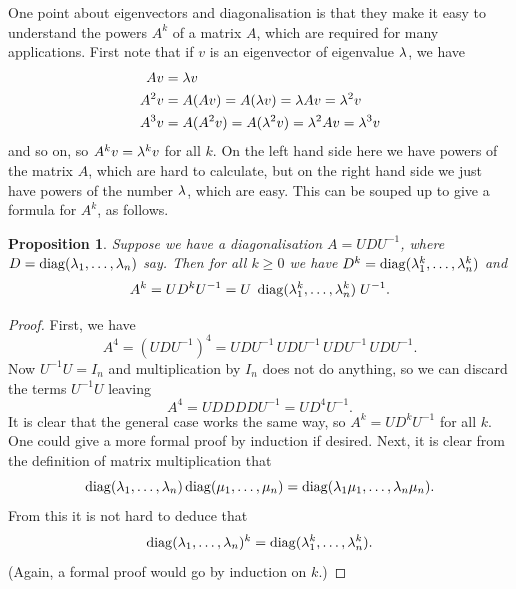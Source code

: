 \documentclass[reqno]{amsart}
\newtheorem{proposition}[theorem]{Proposition}
\theoremstyle{definition}
\begin{document}
One point about eigenvectors and diagonalisation is that they make it
easy to understand the powers $A^k$ of a matrix $A$, which are
required for many applications.  First note that if $v$ is an
eigenvector of eigenvalue $\lambda$, we have
\begin{align*}
 Av &= \lambda v \\
 A^2v &= A(Av)= A(\lambda v) = \lambda Av = \lambda^2v \\
 A^3v &= A(A^2v) = A(\lambda^2 v) = \lambda^2Av = \lambda^3 v 
\end{align*}
and so on, so $A^kv=\lambda^kv$ for all $k$.  On the left hand side here
we have powers of the matrix $A$, which are hard to calculate, but on
the right hand side we just have powers of the number $\lambda$, which are
easy.  This can be souped up to give a formula for $A^k$, as follows.

\begin{proposition}\label{prop-diag-powers}
 Suppose we have a diagonalisation $A=UDU^{-1}$, where
 $D=\operatorname{diag}(\lambda_1,\dotsc,\lambda_n)$ say.  Then for all $k\geq 0$ we have 
 $D^k=\operatorname{diag}(\lambda_1^k,\dotsc,\lambda_n^k)$ and 
 \[ A^k = UD^kU^{-1} = U\;\operatorname{diag}(\lambda_1^k,\dotsc,\lambda_n^k)\;U^{-1}. \]
\end{proposition}
\begin{proof}
 First, we have 
 \[ A^4 = (UDU^{-1})^4 = 
    UDU^{-1}\,UDU^{-1}\,UDU^{-1}\,UDU^{-1}.
 \]
 Now $U^{-1}U=I_n$ and multiplication by $I_n$ does not do anything,
 so we can discard the terms $U^{-1}U$ leaving
 \[ A^4 = UDDDDU^{-1} = UD^4 U^{-1}. \]
 It is clear that the general case works the same way, so
 $A^k=UD^kU^{-1}$ for all $k$.  One could give a more formal proof by
 induction if desired.  Next, it is clear from the definition of
 matrix multiplication that
 \[ \operatorname{diag}(\lambda_1,\dotsc,\lambda_n)\operatorname{diag}(\mu_1,\dotsc,\mu_n) =
     \operatorname{diag}(\lambda_1\mu_1,\dotsc,\lambda_n\mu_n).
 \]
 From this it is not hard to deduce that 
 \[ \operatorname{diag}(\lambda_1,\dotsc,\lambda_n)^k = \operatorname{diag}(\lambda_1^k,\dotsc,\lambda_n^k). \]
 (Again, a formal proof would go by induction on $k$.)
\end{proof}
\end{document}
